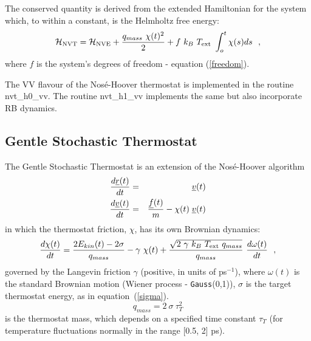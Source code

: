 The conserved quantity is derived from the extended Hamiltonian for
the system which, to within a constant, is the Helmholtz free
energy:
\begin{equation}
{\cal H}_{\rm NVT} = {\cal H}_{\rm NVE} + {q_{mass}~\chi (t)^{2} \over 2} +
f~k_{B}~T_{\rm ext}~\int_o^t \chi (s) ds~~,
\end{equation}
where $f$ is the system's degrees of freedom - equation
(\ref{freedom}).

The VV flavour of the Nos\'e-Hoover thermostat is implemented in
the \D routine {\sc nvt\_h0\_vv}.
The routine {\sc nvt\_h1\_vv} implements the
same but also incorporate RB dynamics.

\subsection{Gentle Stochastic Thermostat}

The Gentle Stochastic Thermostat \cite{leimkuhler-09a,samoletov-07a} is
an extension of the Nos\'e-Hoover algorithm \cite{hoover-85a}
\begin{eqnarray}
{d \mbox{$\underline{r}$}(t) \over d t} &=& \mbox{$\underline{v}$}(t) \nonumber \\
{d \mbox{$\underline{v}$}(t) \over d t} &=& {\mbox{$\underline{f}$}(t) \over m} - \chi (t) \; \mbox{$\underline{v}$}(t)
\end{eqnarray}
in which the thermostat friction, $\chi$, has its own Brownian dynamics:
\begin{equation}
{d \chi (t) \over dt} = \frac{2 E_{kin}(t) - 2 \sigma}{q_{mass}} - \gamma~\chi(t) +
\frac{\sqrt{2~\gamma~k_{B}~T_{\rm ext}~q_{mass}}}{q_{mass}}~{d \omega(t) \over d t}~~, \label{Ornstein-Uhlenbeck}
\end{equation}
governed by the Langevin friction $\gamma$ (positive, in units of ps$^{-1}$),
where $\omega(t)$ is the standard Brownian motion (Wiener process - {\tt Gauss}(0,1)),
$\sigma$ is the target thermostat energy, as in equation~(\ref{sigma}).
\begin{equation}
q_{mass} = 2~\sigma~\tau_{T}^{2}
\end{equation}
is the thermostat mass, which depends on a specified time constant
$\tau_{T}$ (for temperature fluctuations normally in the range [0.5,
2] ps).

